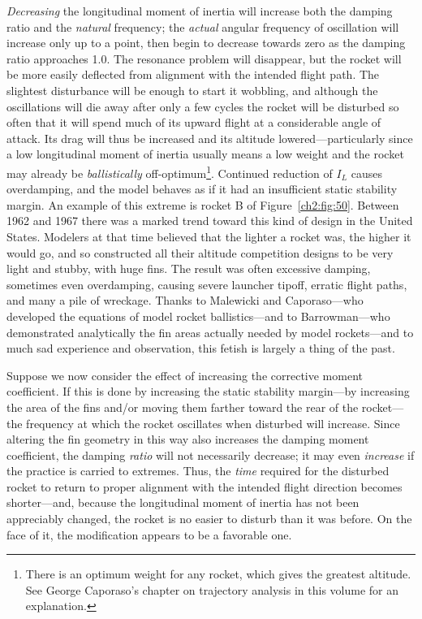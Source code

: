 \emph{Decreasing} the longitudinal moment of inertia will increase both the
damping ratio and the \emph{natural} frequency; the \emph{actual} angular
frequency of oscillation will increase only up to a point, then begin to
decrease towards zero as the damping ratio approaches 1.0. The resonance
problem will disappear, but the rocket will be more easily deflected from
alignment with the intended flight path. The slightest disturbance will be
enough to start it wobbling, and although the oscillations will die away
after only a few cycles the rocket will be disturbed so often that it will
spend much of its upward flight at a considerable angle of attack. Its drag
will thus be increased and its altitude lowered---particularly since a low
longitudinal moment of inertia usually means a low weight and the rocket may
already be \emph{ballistically} off-optimum\footnote{There is an optimum
weight for any rocket, which gives the greatest altitude. See George
Caporaso's chapter on trajectory analysis in this volume for an
explanation.}. Continued reduction of $I_L$ causes overdamping, and the model
behaves as if it had an insufficient static stability margin. An example of
this extreme is rocket B of Figure~\ref{ch2:fig:50}. Between 1962 and 1967
there was a marked trend toward this kind of design in the United States.
Modelers at that time believed that the lighter a rocket was, the higher it
would go, and so constructed all their altitude competition designs to be
very light and stubby, with huge fins. The result was often excessive
damping, sometimes even overdamping, causing severe launcher tipoff, erratic
flight paths, and many a pile of wreckage. Thanks to Malewicki and
Caporaso---who developed the equations of model rocket ballistics---and to
Barrowman---who demonstrated analytically the fin areas actually needed by
model rockets---and to much sad experience and observation, this fetish is
largely a thing of the past.

Suppose we now consider the effect of increasing the corrective moment
coefficient. If this is done by increasing the static stability margin---by
increasing the area of the fins and/or moving them farther toward the rear of
the rocket---the frequency at which the rocket oscillates when disturbed will
increase. Since altering the fin geometry in this way also increases the
damping moment coefficient, the damping \emph{ratio} will not necessarily
decrease; it may even \emph{increase} if the practice is carried to extremes.
Thus, the \emph{time} required for the disturbed rocket to return to proper
alignment with the intended flight direction becomes shorter---and, because
the longitudinal moment of inertia has not been appreciably changed, the
rocket is no easier to disturb than it was before. On the face of it, the
modification appears to be a favorable one.

